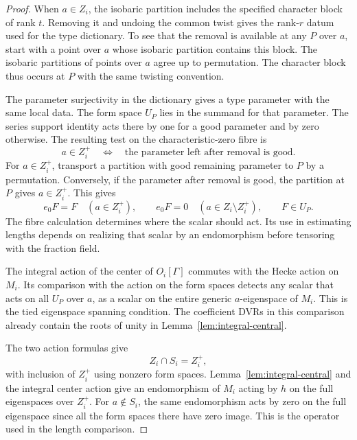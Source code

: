\begin{proof}
When \(a\in Z_i\), the isobaric partition includes the specified
character block of rank \(t\). Removing it and undoing the common
twist gives the rank-\(r\) datum used for the type dictionary.
To see that the removal is available at any \(P\) over \(a\), start
with a point over \(a\) whose isobaric partition contains this block. The isobaric
partitions of points over \(a\) agree up to permutation. The
character block thus occurs at \(P\) with the same twisting
convention.

The parameter surjectivity in the dictionary gives
a type parameter with the same local data. The form space
\(U_P\) lies in the summand for that parameter. The series support
identity acts there by one for a good parameter and by zero
otherwise. The resulting test on the characteristic-zero fibre is
\[
 a\in Z_i^+\quad\Longleftrightarrow\quad\text{the parameter left after removal is good}.
\]
For \(a\in Z_i^+\), transport a partition with good remaining parameter to \(P\)
by a permutation. Conversely, if the parameter after removal is good,
the partition at \(P\) gives \(a\in Z_i^+\). This gives
\[
 e_0 F=F\quad(a\in Z_i^+),\qquad
 e_0 F=0\quad(a\in Z_i\setminus Z_i^+),\qquad F\in U_P .
\]
The fibre calculation determines where the scalar should act. Its use in estimating lengths depends on realizing that scalar by an endomorphism before tensoring with the fraction field.

The integral action of the center of \(O_i[\Gamma]\)
commutes with the Hecke action on \(M_i\). Its comparison with
the action on the form spaces detects any scalar that acts on
all \(U_P\) over \(a\), as a scalar on the entire generic
\(a\)-eigenspace of \(M_i\). This is the tied eigenspace spanning
condition. The coefficient DVRs in this comparison already
contain the roots of unity in Lemma~\ref{lem:integral-central}.

The two action formulas give
\[
 Z_i\cap S_i=Z_i^+,
\]
with inclusion
of \(Z_i^+\) using nonzero form spaces. Lemma~\ref{lem:integral-central}
and the integral center action give an endomorphism of \(M_i\)
acting by \(h\) on the full eigenspaces over \(Z_i^+\). For
\(a\notin S_i\), the same endomorphism acts by zero on the
full eigenspace since all the form spaces there have zero
image. This is the operator used in the length comparison.


\end{proof}
